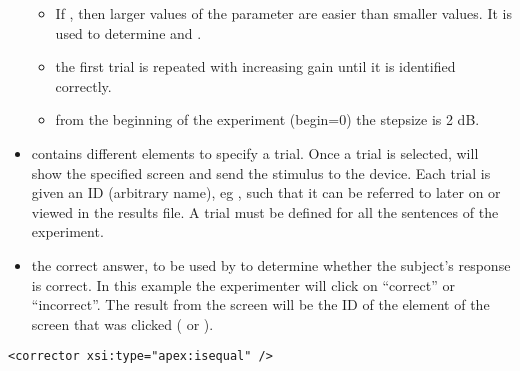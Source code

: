 \begin{itemize}
\begin{itemize}
\item {} If , then larger values
of the parameter are easier than smaller values. It is used to
determine  and .

\item {} the first trial is
repeated with increasing gain until it is identified correctly.

\item {} from the beginning of the experiment
(begin=0) the stepsize is 2 dB.
\end{itemize}

\item {} contains different  elements
to specify a trial. Once a trial is selected, 
will show the specified screen and send the stimulus to the
device. Each trial is given an ID (arbitrary name), eg
, such that it can be referred to later on or
viewed in the results file. A trial must be defined for all the
sentences of the experiment.

\item {} the correct answer, to be used by \apex to
determine whether the subject's response is correct. In this
example the experimenter will click on ``correct'' or
``incorrect''. The result from the screen will be the ID of the
element of the screen that was clicked ( or
).

\end{itemize}
















\begin{lstlisting}
<corrector xsi:type="apex:isequal" />
\end{lstlisting}

